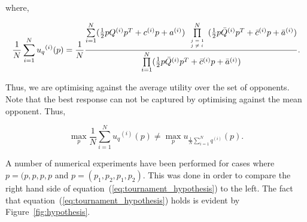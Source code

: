 \documentclass[10pt]{article}
\begin{document}
where,

\begin{equation}\label{eq:tournament_utility}
    \frac{1}{N} \sum\limits_{i=1} ^ {N} {u_q}^{(i)} (p) = \frac{1}{N}
    \frac{\sum\limits_{i=1} ^ {N} (\frac{1}{2} pQ^{(i)} p^T + c^{(i)} p + a^ {(i)})
    \prod\limits_{\tiny\begin{array}{l} j=1 \\ j \neq i \end{array}} ^ 
    N (\frac{1}{2} p\bar{Q}^{(i)} p^T + \bar{c}^{(i)} p + \bar{a}^ {(i)})}
    {\prod\limits_{i=1} ^ N (\frac{1}{2} p\bar{Q}^{(i)} p^T + \bar{c}^{(i)} p + \bar{a}^ {(i)})}.
\end{equation}

Thus, we are optimising against the average utility over the set of opponents.
Note that the best response can not be captured by optimising against the mean
opponent. Thus, 

\begin{equation}\label{eq:tournament_hypothesis}
    \max_p \frac{1}{N} \sum_{i=1} ^ {N} {u_q}^{(i)} (p) \neq \max_p
      u_{\frac {1}{N} \sum\limits_{i=1} ^ N q^{(i)}}(p).
\end{equation}

A number of numerical experiments have been performed for cases where \(p=(p, p, p, p\)
and \(p= (p_1, p_2, p_1, p_2)\). This was done in order to compare the right hand
side of equation~(\ref{eq:tournament_hypothesis}) to the left. The fact that
equation~(\ref{eq:tournament_hypothesis}) holds is evident by Figure~\ref{fig:hypothesis}.
\end{document}
